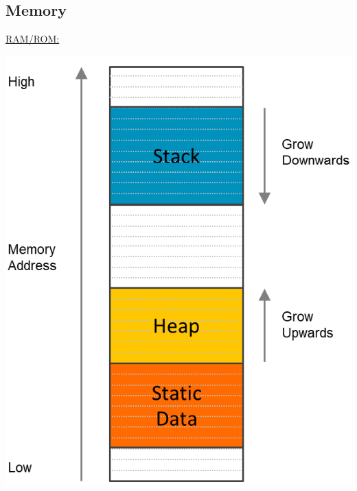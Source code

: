 \subsection*{Memory}
\underline{RAM/ROM:}\\
\begin{minipage}{.49\columnwidth}
    \centering
    \includegraphics[width=\linewidth]{images/ram1.png}
\end{minipage}
